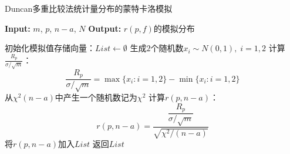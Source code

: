 \begin{algorithm}[H]
	\caption{Duncan多重比较法统计量分布的蒙特卡洛模拟}
	\begin{algorithmic}[1]
		\State \textbf{Input:} $m$, $p$, $n-a$, $N$ 
		\State \textbf{Output:} $r(p,f)$的模拟分布
		
		\State 初始化模拟值存储向量：$List\gets\emptyset$
		\State 生成$2$个随机数$x_i\sim N(0,1),\;i=1,2$
		\State 计算$\frac{R_p}{\sigma/\sqrt{m}}$：
		\begin{equation*}
			\frac{R_p}{\sigma/\sqrt{m}}=\max\{x_i:i=1,2\}-\min\{x_i:i=1,2\}
		\end{equation*}
		\State 从$\chi^2(n-a)$中产生一个随机数记为$\chi^2$
		\State 计算$r(p,n-a)$：
		\begin{equation*}
			r(p,n-a)=\frac{\dfrac{R_p}{\sigma/\sqrt{m}}}{\sqrt{\chi^2/(n-a)}}
		\end{equation*}
		\State 将$r(p,n-a)$加入$List$
		\EndFor
		\State 返回$List$
	\end{algorithmic}
\end{algorithm}
